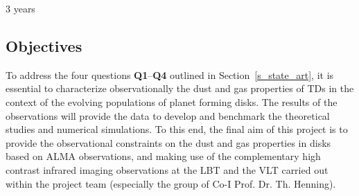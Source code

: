 \documentclass[10pt,fleqn,twoside]{article}
\begin{document}
3 years

\subsection{Objectives}
\label{s_obj}


To address the four questions {\bf Q1}--{\bf Q4} outlined in Section~\ref{s_state_art}, it is 
essential to characterize observationally the dust and gas properties of TDs in the context
of the evolving populations of planet forming disks. The results of the observations will provide the 
data to develop and benchmark the theoretical studies and numerical simulations.  
To this end, the final aim of this project is to provide the observational constraints 
on the dust and gas properties in disks based on ALMA observations, and making use
of the complementary high contrast infrared imaging observations at the LBT and the 
VLT carried out within the project team (especially the group of Co-I Prof. Dr. Th. Henning). 

\end{document}
